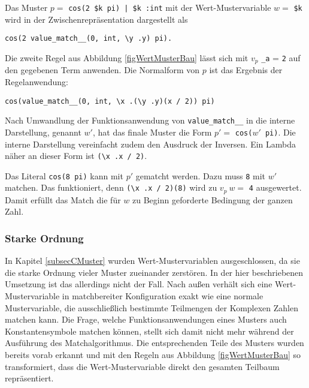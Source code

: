 \begin{beispiel}
Das Muster $p =$ \verb~cos(2 $k pi) | $k :int~ mit der Wert-Mustervariable $w =$ \verb|$k| wird in der Zwischenrepräsentation dargestellt als 
\begin{unbreakable}\begin{verbatim}
cos(2 value_match__(0, int, \y .y) pi). 
\end{verbatim}\end{unbreakable}
Die zweite Regel aus Abbildung \ref{figWertMusterBau} lässt sich mit $v_p$ \verb|_a| = \verb|2| auf den gegebenen Term anwenden. Die Normalform von $p$ ist das Ergebnis der Regelanwendung:
\begin{unbreakable}\begin{verbatim}
cos(value_match__(0, int, \x .(\y .y)(x / 2)) pi)
\end{verbatim}\end{unbreakable}
Nach Umwandlung der Funktionsanwendung von \verb|value_match__| in die interne Darstellung, genannt $w'$, hat das finale Muster die Form $p' =$ \verb|cos(|$w'$\verb| pi)|. 
Die interne Darstellung vereinfacht zudem den Ausdruck der Inversen. Ein Lambda näher an dieser Form ist \verb|(\x .x / 2)|.

Das Literal \verb|cos(8 pi)| kann mit $p'$ gematcht werden. Dazu muss \verb|8| mit $w'$ matchen. Das funktioniert, denn \verb|(\x .x / 2)(8)| wird zu $v_p~w =$ \verb|4| ausgewertet. Damit erfüllt das Match die für $w$ zu Beginn geforderte Bedingung der ganzen Zahl. 
\end{beispiel}

\subsubsection{Starke Ordnung}
In Kapitel \ref{subsecCMuster} wurden Wert-Mustervariablen ausgeschlossen, da sie die starke Ordnung vieler Muster zueinander zerstören. In der hier beschriebenen Umsetzung ist das allerdings nicht der Fall. Nach außen verhält sich eine Wert-Mustervariable in matchbereiter Konfiguration exakt wie eine normale Mustervariable, die ausschließlich bestimmte Teilmengen der Komplexen Zahlen matchen kann. Die Frage, welche Funktionsanwendungen eines Musters auch Konstantensymbole matchen können, stellt sich damit nicht mehr während der Ausführung des Matchalgorithmus. Die entsprechenden Teile des Musters wurden bereits vorab erkannt und mit den Regeln aus Abbildung \ref{figWertMusterBau} so transformiert, dass die Wert-Mustervariable direkt den gesamten Teilbaum repräsentiert.

